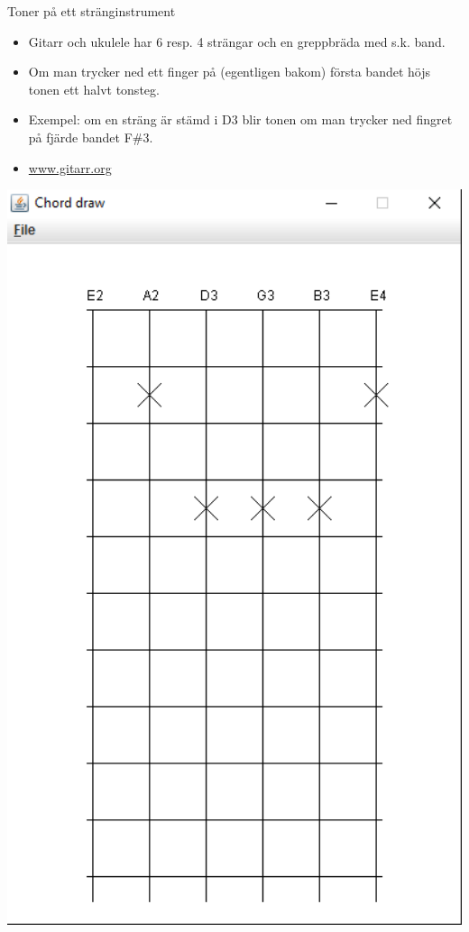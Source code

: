 \begin{Slide}{Toner på ett stränginstrument}
\begin{minipage}{0.5\textwidth}
\begin{itemize}\SlideFontSmall
\item Gitarr och ukulele har 6 resp. 4 strängar och en greppbräda med s.k. band.

\item Om man trycker ned ett finger på (egentligen bakom) första bandet höjs tonen ett halvt tonsteg.

\item Exempel: om en sträng är stämd i D3 blir tonen om man trycker ned fingret på fjärde bandet F\#3.

\item \href{http://www.gitarr.org}{www.gitarr.org}

\end{itemize}
\end{minipage}
\begin{minipage}{0.45\textwidth}
\includegraphics[width=1.0\textwidth]{../img/chords/ChordDraw}
\end{minipage}

\end{Slide}

